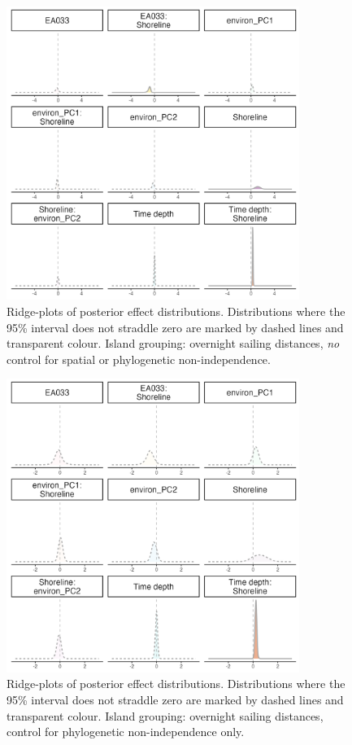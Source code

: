 \documentclass[unnumsec,webpdf,modern,medium]{oup-authoring-template}
\begin{document}
\begin{figure}[ht]
\includegraphics[width=0.85\textwidth]{brms_SBZR_control_none_group_full_effect_ridge_panels_plot.png}
\caption{Ridge-plots of posterior effect distributions. Distributions where the 95\% interval does not straddle zero are marked by dashed lines and transparent colour. Island grouping: overnight sailing distances, \emph{no} control for spatial or phylogenetic non-independence.}
\label{brms_SBZR_control_none_group_full_effect_ridge_panels_plot}
\end{figure}


\begin{figure}[ht]
\includegraphics[width=0.85\textwidth]{brms_SBZR_control_phylo_group_full_effect_ridge_panels_plot.png}
\caption{Ridge-plots of posterior effect distributions. Distributions where the 95\% interval does not straddle zero are marked by dashed lines and transparent colour. Island grouping: overnight sailing distances, control for phylogenetic non-independence only.}
\label{brms_SBZR_group_full_effect_ridge_panels_phylo}
\end{figure}
\end{document}

